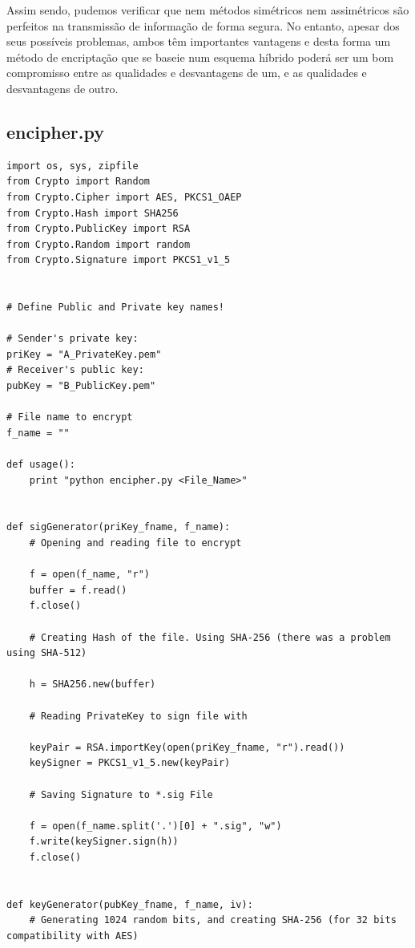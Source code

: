 \documentclass[a4paper,11pt,openright,oneside]{report}
\begin{document}
Assim sendo, pudemos verificar que nem métodos simétricos nem assimétricos são perfeitos na transmissão de informação de forma segura. No entanto, apesar dos seus possíveis problemas, ambos têm importantes vantagens e desta forma um método de encriptação que se baseie num esquema híbrido poderá ser um bom compromisso entre as qualidades e desvantagens de um, e as qualidades e desvantagens de outro. 

\newpage

\begin{appendices}
\section{encipher.py}
\label{encipher.py}

\begin{verbatim}
import os, sys, zipfile
from Crypto import Random
from Crypto.Cipher import AES, PKCS1_OAEP
from Crypto.Hash import SHA256
from Crypto.PublicKey import RSA
from Crypto.Random import random
from Crypto.Signature import PKCS1_v1_5


# Define Public and Private key names!

# Sender's private key:
priKey = "A_PrivateKey.pem"
# Receiver's public key:
pubKey = "B_PublicKey.pem"

# File name to encrypt
f_name = ""

def usage():
    print "python encipher.py <File_Name>"


def sigGenerator(priKey_fname, f_name):
    # Opening and reading file to encrypt

    f = open(f_name, "r")
    buffer = f.read()
    f.close()

    # Creating Hash of the file. Using SHA-256 (there was a problem using SHA-512)

    h = SHA256.new(buffer)

    # Reading PrivateKey to sign file with

    keyPair = RSA.importKey(open(priKey_fname, "r").read())
    keySigner = PKCS1_v1_5.new(keyPair)

    # Saving Signature to *.sig File

    f = open(f_name.split('.')[0] + ".sig", "w")
    f.write(keySigner.sign(h))
    f.close()


def keyGenerator(pubKey_fname, f_name, iv):
    # Generating 1024 random bits, and creating SHA-256 (for 32 bits compatibility with AES)


\end{verbatim}
\end{appendices}
\end{document}
